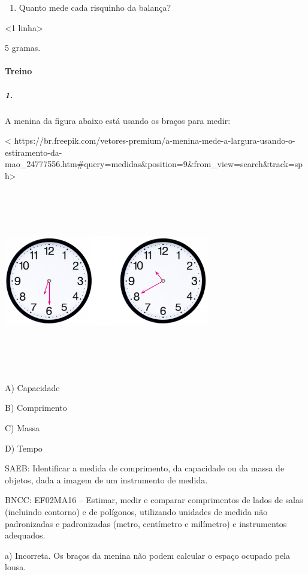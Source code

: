 \begin{enumerate}
\def\labelenumi{\alph{enumi})}
\item
  Quanto mede cada risquinho da balança?
\end{enumerate}

\textless{}1 linha\textgreater{}

5 gramas.

\paragraph{Treino}\label{treino-2}

\subparagraph{1.}\label{section-39}

A menina da figura abaixo está usando os braços para medir:

\textless{}
https://br.freepik.com/vetores-premium/a-menina-mede-a-largura-usando-o-estiramento-da-mao\_24777556.htm\#query=medidas\&position=9\&from\_view=search\&track=sph\textgreater{}

\includegraphics[width=3.53125in,height=3.14257in]{media/image55.png}

A) Capacidade

B) Comprimento

C) Massa

D) Tempo

SAEB: Identificar a medida de comprimento, da capacidade ou da
massa de objetos, dada a imagem de um instrumento de medida.

BNCC: EF02MA16 -- Estimar, medir e comparar comprimentos de lados de
salas (incluindo contorno) e de polígonos, utilizando unidades de medida não padronizadas e
padronizadas (metro, centímetro e milímetro) e instrumentos adequados.

a) Incorreta. Os braços da menina não podem calcular o espaço ocupado
pela lousa.


